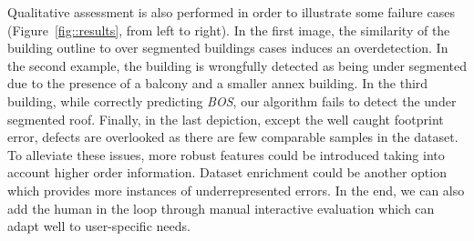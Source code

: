\documentclass[conference]{IEEEtran}
\begin{document}
Qualitative assessment is also performed in order to illustrate some failure cases (Figure~\ref{fig::results}, from left to right). In the first image, the similarity of the building outline to over segmented buildings cases induces an overdetection. In the second example, the building is wrongfully detected as being under segmented due to the presence of a balcony and a smaller annex building. In the third building, while correctly predicting \textit{BOS}, our algorithm fails to detect the under segmented roof. Finally, in the last depiction, except the well caught footprint error, defects are overlooked as there are few comparable samples in the dataset. To alleviate these issues, more robust features could be introduced taking into account higher order information. Dataset enrichment could be another option which provides more instances of underrepresented errors. In the end, we can also add the human in the loop through manual interactive evaluation which can adapt well to user-specific needs.
\end{document}
